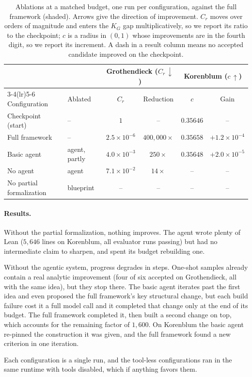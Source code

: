 \begin{table}[htbp]
\centering
\small
\setlength{\tabcolsep}{7pt}
\renewcommand{\arraystretch}{1.1}
\begin{tabular}{@{}llcccc@{}}
\toprule
& & \multicolumn{2}{c}{Grothendieck ($C_r\,\downarrow$)} & \multicolumn{2}{c}{Korenblum ($c\,\uparrow$)} \\
\cmidrule(lr){3-4}\cmidrule(lr){5-6}
Configuration & Ablated & $C_r$ & Reduction & $c$ & Gain \\
\midrule
Checkpoint (start)       & --             & $1$                & --                & $0.35646$ & -- \\
\addlinespace[2pt]
\rowcolor{gray!20}
Full framework           & --             & $2.5\times10^{-6}$ & $400{,}000\times$ & $0.35658$ & $+1.2\times10^{-4}$ \\
Basic agent              & agent, partly  & $4.0\times10^{-3}$ & $250\times$       & $0.35648$ & $+2.0\times10^{-5}$ \\
No agent                 & agent          & $7.1\times10^{-2}$ & $14\times$        & --        & -- \\
No partial formalization & blueprint      & --                 & --                & --        & -- \\
\bottomrule
\end{tabular}
\caption{Ablations at a matched budget, one run per configuration, against the
full framework (shaded). Arrows give the direction of improvement. $C_r$
moves over orders of magnitude and enters the $K_G$ gap multiplicatively, so
we report its ratio to the checkpoint; $c$ is a radius in $(0,1)$ whose
improvements are in the fourth digit, so we report its increment. A dash in a
result column means no accepted candidate improved on the checkpoint.}
\label{tab:ablations}
\end{table}

\paragraph{Results.}
Without the partial formalization, nothing improves. The agent wrote plenty of
Lean ($5{,}646$ lines on Korenblum, all evaluator runs passing) but had no
intermediate claim to sharpen, and spent its budget rebuilding one.

Without the agentic system, progress degrades in steps. One-shot samples
already contain a real analytic improvement (four of six accepted on
Grothendieck, all with the same idea), but they stop there. The basic agent
iterates past the first idea and even proposed the full framework's key
structural change, but each build failure cost it a full model call and it
completed that change only at the end of its budget. The full framework
completed it, then built a second change on top, which accounts for the
remaining factor of $1{,}600$. On Korenblum the basic agent re-pinned the
construction it was given, and the full framework found a new criterion in one
iteration.

Each configuration is a single run, and the tool-less configurations ran in the
same runtime with tools disabled, which if anything favors them.
